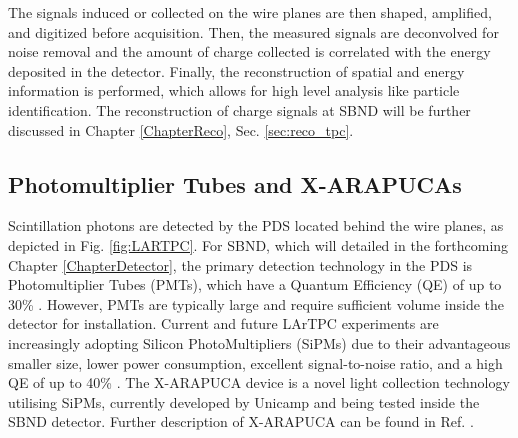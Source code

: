 The signals induced or collected on the wire planes are then shaped, amplified, and digitized before acquisition.
Then, the measured signals are deconvolved for noise removal and the amount of charge collected is correlated with the energy deposited in the detector.
Finally, the reconstruction of spatial and energy information is performed, which allows for high level analysis like particle identification.
The reconstruction of charge signals at SBND will be further discussed in Chapter \ref{ChapterReco}, Sec. \ref{sec:reco_tpc}.

\subsection{Photomultiplier Tubes and X-ARAPUCAs}
\label{sec:pmtarapuca}

Scintillation photons are detected by the PDS located behind the wire planes, as depicted in Fig. \ref{fig:LARTPC}. 
For SBND, which will detailed in the forthcoming Chapter \ref{ChapterDetector}, the primary detection technology in the PDS is Photomultiplier Tubes (PMTs), which have a Quantum Efficiency (QE) of up to 30\% \cite{pmt_qe}.
However, PMTs are typically large and require sufficient volume inside the detector for installation. 
Current and future LArTPC experiments are increasingly adopting Silicon PhotoMultipliers (SiPMs) due to their advantageous smaller size, lower power consumption, excellent signal-to-noise ratio, and a high QE of up to 40\% \cite{sipm_qe}.
The X-ARAPUCA device is a novel light collection technology utilising SiPMs, currently developed by Unicamp and being tested inside the SBND detector. 
Further description of X-ARAPUCA can be found in Ref. \cite{xarapuca}.

%

